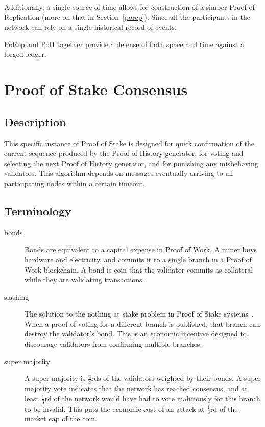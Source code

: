\documentclass[12pt]{article}
\begin{document}
Additionally, a single source of time allows for construction of a simper Proof of Replication (more on that in Section~\ref{porep}). Since all the participants in the network can rely on a single historical record of events.

PoRep and PoH together provide a defense of both space and time against a forged ledger.


\section{Proof of Stake Consensus}\label{proof_of_stake}
\subsection{Description}
This specific instance of Proof of Stake is designed for quick confirmation of the current sequence produced by the Proof of History generator, for voting and selecting the next Proof of History generator, and for punishing any misbehaving validators. This algorithm depends on messages eventually arriving to all participating nodes within a certain timeout.
\subsection{Terminology}
\begin{description}

\item[bonds]
Bonds are equivalent to a capital expense in Proof of Work. A miner buys hardware and electricity, and commits it to a single branch in a Proof of Work blockchain. A bond is coin that the validator commits as collateral while they are validating transactions.

\item[slashing]

The solution to the nothing at stake problem in Proof of Stake systems~\cite{slasher}.  When a proof of voting for a different branch is published, that branch can destroy the validator's bond.  This is an economic incentive designed to discourage validators from confirming multiple branches.
\item[super majority]
A super majority is \(\frac{2}{3}\)rds of the validators weighted by their bonds.  A super majority vote indicates that the network has reached consensus, and at least \(\frac{1}{3}\)rd of the network would have had to vote maliciously for this branch to be invalid.  This puts the economic cost of an attack at \(\frac{1}{3}\)rd of the market cap of the coin.

\end{description}
\end{document}
